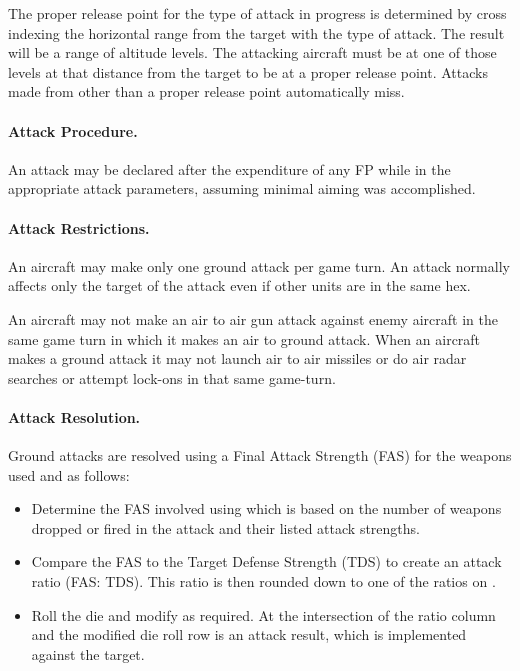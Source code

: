 The proper release point for the type of attack in progress is determined by cross indexing the horizontal range from the target with the type of attack. The result will be a range of altitude levels. The attacking aircraft must be at one of those levels at that distance from the target to be at a proper release point. Attacks made from other than a proper release point automatically miss.

\paragraph{Attack Procedure.} An attack may be declared after the expenditure of any FP while in the appropriate attack parameters, assuming minimal aiming was accomplished.

\paragraph{Attack Restrictions.} An aircraft may make only one ground attack per game turn. An attack normally affects only the target of the attack even if other units are in the same hex.

An aircraft may not make an air to air gun attack against enemy aircraft in the same game turn in which it makes an air to ground attack. When an aircraft makes a ground attack it may not launch air to air missiles or do air radar searches or attempt lock-ons in that same game-turn.

\paragraph{Attack Resolution.} 



Ground attacks are resolved using a Final Attack Strength (FAS) for the weapons used and  as follows:
\begin{itemize}
\item Determine the FAS involved using  which is based on the number of weapons dropped or fired in the attack and their listed attack strengths.
\item Compare the FAS to the Target Defense Strength (TDS) to create an attack ratio (FAS: TDS). This ratio is then rounded down to one of the ratios on .
\item Roll the die and modify as required. At the intersection of the ratio column and the modified die roll row is an attack result, which is implemented against the target.
\end{itemize}

